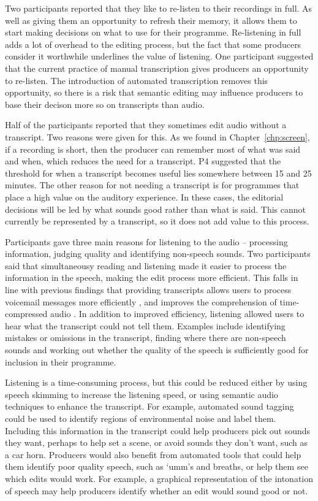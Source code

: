 Two participants reported that they like to re-listen to their recordings in full. As well as giving them an
opportunity to refresh their memory, it allows them to start making decisions on what to use for their programme.
Re-listening in full adds a lot of overhead to the editing process, but the fact that some producers consider it
worthwhile underlines the value of listening. One participant suggested that the current practice of manual
transcription gives producers an opportunity to re-listen. The introduction of automated transcription removes this
opportunity, so there is a risk that semantic editing may influence producers to base their decison more so on
transcripts than audio.

Half of the participants reported that they sometimes edit audio without a transcript. Two reasons were given for
this. As we found in Chapter~\ref{chp:screen}, if a recording is short, then the producer can remember most of what was
said and when, which reduces the need for a transcript. P4 suggested that the threshold for when a transcript becomes
useful lies somewhere between 15 and 25 minutes. The other reason for not needing a transcript is for programmes that
place a high value on the auditory experience. In these cases, the editorial decisions will be led by what sounds good
rather than what is said. This cannot currently be represented by a transcript, so it does not add value to this
process.

Participants gave three main reasons for listening to the audio -- processing information, judging quality and
identifying non-speech sounds. Two participants said that simultaneousy reading and listening made it easier to process
the information in the speech, making the edit process more efficient. This falls in line with previous findings that
providing transcripts allows users to process voicemail messages more efficiently \citep{Whittaker2002}, and improves
the comprehension of time-compressed audio \citep{Vemuri2004}. In addition to improved efficiency, listening allowed
users to hear what the transcript could not tell them. Examples include identifying mistakes or omissions in the
transcript, finding where there are non-speech sounds and working out whether the quality of the speech is sufficiently
good for inclusion in their programme.

Listening is a time-consuming process, but this could be reduced either by using speech skimming \citep{Arons1997} to
increase the listening speed, or using semantic audio techniques to enhance the transcript. For example, automated
sound tagging \citep{Duan2014} could be used to identify regions of environmental noise and label them. Including this
information in the transcript could help producers pick out sounds they want, perhaps to help set a scene, or avoid
sounds they don't want, such as a car horn. Producers would also benefit from automated tools that could help them
identify poor quality speech, such as `umm's and breaths, or help them see which edits would work.  For example, a
graphical representation of the intonation of speech may help producers identify whether an edit would sound good or
not.

